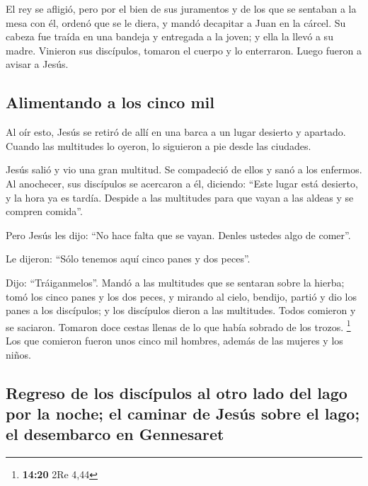  El rey se afligió, pero por el bien de sus juramentos y
de los que se sentaban a la mesa con él, ordenó que se le diera,
 y mandó decapitar a Juan en la cárcel. 
Su cabeza fue traída en una bandeja y entregada a la joven; y ella la
llevó a su madre.  Vinieron sus discípulos, tomaron el
cuerpo y lo enterraron. Luego fueron a avisar a Jesús.

\hypertarget{alimentando-a-los-cinco-mil}{%
\subsection{Alimentando a los cinco
mil}\label{alimentando-a-los-cinco-mil}}

 Al oír esto, Jesús se retiró de allí en una barca a un
lugar desierto y apartado. Cuando las multitudes lo oyeron, lo siguieron
a pie desde las ciudades.

 Jesús salió y vio una gran multitud. Se compadeció de
ellos y sanó a los enfermos.  Al anochecer, sus
discípulos se acercaron a él, diciendo: ``Este lugar está desierto, y la
hora ya es tardía. Despide a las multitudes para que vayan a las aldeas
y se compren comida''.

 Pero Jesús les dijo: ``No hace falta que se vayan.
Denles ustedes algo de comer''.

 Le dijeron: ``Sólo tenemos aquí cinco panes y dos
peces''.

 Dijo: ``Tráiganmelos''.  Mandó a las
multitudes que se sentaran sobre la hierba; tomó los cinco panes y los
dos peces, y mirando al cielo, bendijo, partió y dio los panes a los
discípulos; y los discípulos dieron a las multitudes. 
Todos comieron y se saciaron. Tomaron doce cestas llenas de lo que había
sobrado de los trozos. \footnote{\textbf{14:20} 2Re 4,44}
 Los que comieron fueron unos cinco mil hombres, además
de las mujeres y los niños.

\hypertarget{regreso-de-los-discuxedpulos-al-otro-lado-del-lago-por-la-noche-el-caminar-de-jesuxfas-sobre-el-lago-el-desembarco-en-gennesaret}{%
\subsection{Regreso de los discípulos al otro lado del lago por la
noche; el caminar de Jesús sobre el lago; el desembarco en
Gennesaret}\label{regreso-de-los-discuxedpulos-al-otro-lado-del-lago-por-la-noche-el-caminar-de-jesuxfas-sobre-el-lago-el-desembarco-en-gennesaret}}

